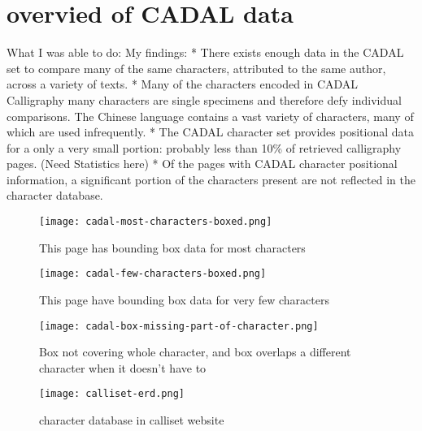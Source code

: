 \chapter{overvied of CADAL data}
What I was able to do:
    My findings:
        * There exists enough data in the CADAL set to compare many of the same characters, attributed to the same author, across a variety of texts.
        *  Many of the characters encoded in CADAL Calligraphy many characters are single specimens and therefore defy individual comparisons.  The Chinese language contains a vast variety of characters, many of which are used infrequently.
        *  The CADAL character set provides positional data for a only a very small portion: probably less than 10\% of retrieved calligraphy pages.  (Need Statistics here)
        *  Of the pages with CADAL character positional information, a significant portion of the characters present are not reflected in the character database.
    
    \begin{figure}{}
    \parbox{12cm}{\texttt{[image: cadal-most-characters-boxed.png]}}
    \caption{This page has bounding box data for most characters}
    \label{cadal most characters boxed}
    \end{figure}
    
    \begin{figure}{}
    \parbox{12cm}{\texttt{[image: cadal-few-characters-boxed.png]}}
    \caption{This page have bounding box data for very few characters}
    \label{cadal less characters boxed}
    \end{figure}
    
    \begin{figure}{}
    \parbox{12cm}{\texttt{[image: cadal-box-missing-part-of-character.png]}}
    \caption{Box not covering whole character, and box overlaps a different character when it doesn't have to}
    \label{cadal single character examples}
    \end{figure}
    
    \begin{figure}{}
    \parbox{12cm}{\texttt{[image: calliset-erd.png]}}
    \caption{character database in calliset website}
    \label{character database in calliset website}
    \end{figure}
    
